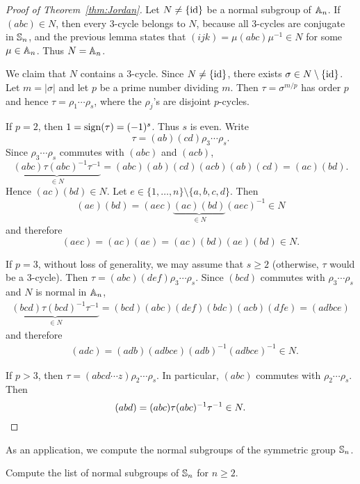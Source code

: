 \begin{proof}[Proof of Theorem~\ref{thm:Jordan}]
Let $N\ne\{\operatorname{id}\}$ be a normal subgroup of $\mathbb{A}_n$. If $(abc)\in N$, then every 3-cycle belongs to $N$, because all 3-cycles 
are conjugate in $\mathbb{S}_n$, and the previous lemma 
states that 
$(ijk)=\mu(abc)\mu^{-1}\in N$ for some
$\mu\in\mathbb{A}_n$. Thus $N=\mathbb{A}_n$. 

We claim that $N$ contains a 3-cycle. 
Since $N\ne\{\operatorname{id}\}$, there exists $\sigma\in N\setminus\{\operatorname{id}\}$. Let $m=|\sigma|$ and let $p$ be a prime number dividing $m$. 
Then $\tau=\sigma^{m/p}$ has order $p$ and hence
$\tau=\rho_1\cdots\rho_s$, where the $\rho_j$'s are disjoint 
$p$-cycles. 

If $p=2$, then $1=\operatorname{sign}(\tau)=(-1)^s$. Thus $s$ is even. Write
\[
\tau=(ab)(cd)\rho_3\cdots\rho_s. 
\]
Since $\rho_3\cdots\rho_s$ commutes with $(abc)$ and $(acb)$, 
\[
\underbrace{(abc)\tau(abc)^{-1}\tau^{-1}}_{\in N}
=(abc)(ab)(cd)(acb)(ab)(cd)=(ac)(bd).
\]
Hence $(ac)(bd)\in N$. Let 
$e\in\{1,\dots,n\}\setminus\{a,b,c,d\}$. Then 
\[
(ae)(bd)=(aec)\underbrace{(ac)(bd)}_{\in N}(aec)^{-1}\in N
\]
and therefore  
\[
(aec)=(ac)(ae)=(ac)(bd)(ae)(bd)\in N.
\]

If $p=3$, without loss of generality, we may assume that $s\geq2$ (otherwise, $\tau$ would be a 3-cycle). Then
$\tau=(abc)(def)\rho_3\cdots\rho_s$. Since $(bcd)$ commutes with
$\rho_3\cdots\rho_s$ and $N$ is normal in $\mathbb{A}_n$, 
\begin{align*}
\underbrace{(bcd)\tau(bcd)^{-1}\tau^{-1}}_{\in N}=(bcd)(abc)(def)(bdc)(acb)(dfe)=(adbce)
\end{align*}
and therefore 
\begin{align*}
&(adc)=(adb)(adbce)(adb)^{-1}(adbce)^{-1}\in N.
\end{align*}

If $p>3$, then $\tau=(abcd\cdots z)\rho_2\cdots\rho_s$. In particular, $(abc)$ commutes with $\rho_2\cdots\rho_s$. Then 
\[
(abd)=(abc)\tau(abc)^{-1}\tau^{-1}\in N.\qedhere
\]
\end{proof}

As an application, we compute the normal subgroups 
of the symmetric group $\mathbb{S}_n$. 

\begin{exercise}
    Compute the list of normal subgroups of $\mathbb{S}_n$ for $n\geq2$. 
\end{exercise}

